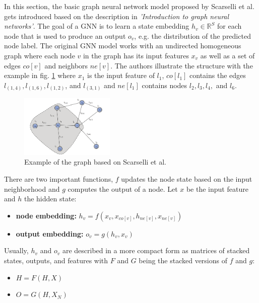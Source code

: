 \documentclass[a4paper,preprint]{sig-alternate}
\begin{document}
In this section, the basic graph neural network model proposed by Scarselli et al. \cite{4700287} gets introduced
based on the description in \textit{'Introduction to graph neural networks'}\cite{article}.\newline
The goal of a GNN is to learn a state embedding $h_v \in \mathbb{R}^S$ for each node that is used to produce an 
output $o_v$, e.g. the distribution of the predicted node label.
The original GNN model works with an undirected homogeneous graph where each node $v$ in the graph has its input features $x_v$
as well as a set of edges $co[v]$ and neighbors $ne[v]$. The authors illustrate the structure with the example in fig. \ref{fig:graph}
where $x_{1}$ is the input feature of $l_1$, $co[l_1]$ contains the edges $l_{(1, 4)}, l_{(1, 6)}, l_{(1, 2)}$, and $l_{(3, 1)}$ and $ne[l_1]$
contains nodes $l_2, l_3, l_4,$ and $l_6$.

\begin{figure}[h]
    \centering
    \includegraphics[width=0.4\textwidth]{img/graph.png}
    \caption{Example of the graph based on Scarselli et al. \cite{article}}
    \label{fig:graph}
\end{figure}

There are two important functions, $f$ updates the node state based on the input neighborhood and $g$ computes the output of a node.
Let $x$ be the input feature and $h$ the hidden state:
\begin{itemize}
    \item \textbf{node embedding:} $h_v = f(x_v, x_{co[v]}, h_{ne[v]}, x_{ne[v]})$
    \item \textbf{output embedding:} $o_v = g(h_v, x_v)$
\end{itemize}

Usually, $h_v$ and $o_v$ are described in a more compact form as matrices of stacked states,
outputs, and features with $F$ and $G$ being the stacked versions of $f$ and $g$:
\begin{itemize}
    \item $H = F(H, X)$
    \item $O = G(H, X_N)$
\end{itemize}
\end{document}
